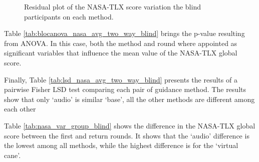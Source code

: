 \begin{figure}[!htb]
\begin{minipage}{0.45\textwidth}
        \caption{Residual plot of the NASA-TLX score variation the blind participants on each method.}
        \label{fig:residplot_nasa_avg_two_way_blind}
    \end{minipage}
\end{figure}

Table \ref{tab:blocanova_nasa_avg_two_way_blind} brings the p-value resulting from ANOVA. In this case, both the method and round where appointed as significant variables that influence the mean value of the NASA-TLX global score. 



Finally, Table \ref{tab:lsd_nasa_avg_two_way_blind} presents the results of a pairwise Fisher LSD test comparing each pair of guidance method. The results show that only ‘audio’ is similar ‘base’, all the other methods are different among each other



Table \ref{tab:nasa_var_group_blind} shows the difference in the NASA-TLX global score between the first and return rounds. It shows that the ‘audio’ difference is the lowest among all methods, while the highest difference is for the ‘virtual cane’.



\FloatBarrier